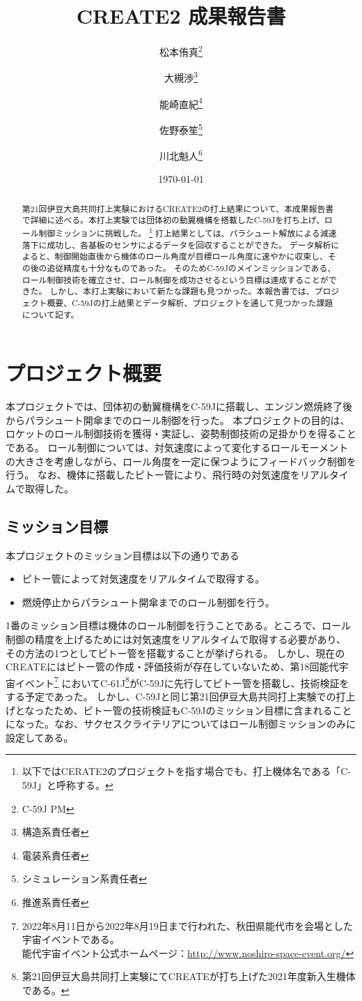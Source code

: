 \documentclass[a4paper,11pt,uplatex]{jsarticle}
\title{CREATE2 成果報告書}
\date{\today}
\author{松本侑真\thanks{C-59J PM}\and{大槻渉}\thanks{構造系責任者}
\and{能崎直紀}\thanks{電装系責任者}\and{佐野泰笙}\thanks{シミュレーション系責任者}
\and{川北魁人}\thanks{推進系責任者}}
\begin{document}
\maketitle


\begin{abstract}
	第21回伊豆大島共同打上実験におけるCREATE2の打上結果について、本成果報告書で詳細に述べる。本打上実験では団体初の動翼機構を搭載したC-59Jを打ち上げ、ロール制御ミッションに挑戦した。
	\footnote{以下ではCERATE2のプロジェクトを指す場合でも、打上機体名である「C-59J」と呼称する。}
	打上結果としては、パラシュート解放による減速落下に成功し、各基板のセンサによるデータを回収することができた。
	データ解析によると、制御開始直後から機体のロール角度が目標ロール角度に速やかに収束し、その後の追従精度も十分なものであった。
	そのためC-59Jのメインミッションである、ロール制御技術を確立させ、ロール制御を成功させるという目標は達成することができた。
	しかし、本打上実験において新たな課題も見つかった。本報告書では、プロジェクト概要、C-59Jの打上結果とデータ解析、プロジェクトを通して見つかった課題について記す。
\end{abstract}
\newpage
\tableofcontents
\newpage

\section{プロジェクト概要}
本プロジェクトでは、団体初の動翼機構をC-59Jに搭載し、エンジン燃焼終了後からパラシュート開傘までのロール制御を行った。
本プロジェクトの目的は、ロケットのロール制御技術を獲得・実証し、姿勢制御技術の足掛かりを得ることである。
ロール制御については、対気速度によって変化するロールモーメントの大きさを考慮しながら、ロール角度を一定に保つようにフィードバック制御を行う。
なお、機体に搭載したピトー管により、飛行時の対気速度をリアルタイムで取得した。

\subsection{ミッション目標}
本プロジェクトのミッション目標は以下の通りである
\begin{itemize}
	\item ピトー管によって対気速度をリアルタイムで取得する。
	\item 燃焼停止からパラシュート開傘までのロール制御を行う。
\end{itemize}

1番のミッション目標は機体のロール制御を行うことである。ところで、ロール制御の精度を上げるためには対気速度をリアルタイムで取得する必要があり、
その方法の1つとしてピトー管を搭載することが挙げられる。
しかし、現在のCREATEにはピトー管の作成・評価技術が存在していないため、第18回能代宇宙イベント\footnote{2022年8月11日から2022年8月19日まで行われた、秋田県能代市を会場とした宇宙イベントである。\\
	能代宇宙イベント公式ホームページ：\url{http://www.noshiro-space-event.org/}}
においてC-61J\footnote{第21回伊豆大島共同打上実験にてCREATEが打ち上げた2021年度新入生機体である。}がC-59Jに先行してピトー管を搭載し、技術検証をする予定であった。
しかし、C-59Jと同じ第21回伊豆大島共同打上実験での打上げとなったため、ピトー管の技術検証もC-59Jのミッション目標に含まれることになった。なお、サクセスクライテリアについてはロール制御ミッションのみに設定してある。
\end{document}
